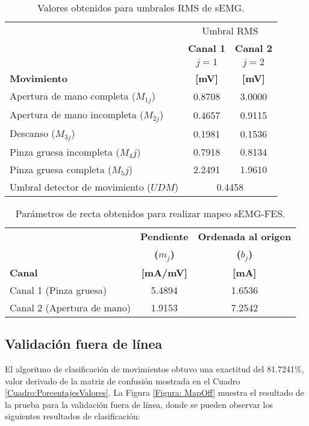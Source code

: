 \begin{table}[htbp]
	\centering
	\begin{tabular}{|l|c|c|}
	\hline
	\textbf{} & \multicolumn{2}{|c|}{Umbral RMS}\\
	\textbf{} & \textbf{Canal 1} & \textbf{Canal 2}\\
	\textbf{} & \textbf{$j=1$} & \textbf{$j=2$}\\
	\textbf{Movimiento} & \textbf{[mV]} & \textbf{[mV]}\\ \hline \hline
	Apertura de mano completa ($M_{1j}$) & 0.8708 & 3.0000\\ \hline
	Apertura de mano incompleta	($M_{2j}$) & 0.4657 & 0.9115\\ \hline
	Descanso ($M_{3j}$) & 0.1981 & 0.1536\\ \hline
	Pinza gruesa incompleta ($M_4j$) & 0.7918 & 0.8134\\ \hline
	Pinza gruesa completa ($M_5j$) & 2.2491 & 1.9610\\ \hline	
	Umbral detector de movimiento ($UDM$) & \multicolumn{2}{|c|}{0.4458}\\ \hline
	\end{tabular}
	\caption{Valores obtenidos para umbrales RMS de sEMG.}
	\label{Cuadro:UmbralesRMS}
\end{table}

\begin{table}[htbp]
	\centering
	\begin{tabular}{|l|c|c|}
	\hline
	\textbf{} & \textbf{Pendiente} & \textbf{Ordenada al origen}\\ 
	\textbf{} & \textbf{($m_{j}$)} & \textbf{($b_{j}$)}\\
	\textbf{Canal} & \textbf{[mA/mV]} & \textbf{[mA]}\\\hline \hline
	Canal 1 (Pinza gruesa) & 5.4894 & 1.6536\\ \hline
	Canal 2 (Apertura de mano) & 1.9153 & 7.2542\\ \hline
	\end{tabular}
	\caption{Parámetros de recta obtenidos para realizar mapeo sEMG-FES.}
	\label{Cuadro:Rectas}
\end{table}


\newpage
\subsection{Validación fuera de línea}
El algoritmo de clasificación de movimientos obtuvo una exactitud del 81.7241\%, valor derivado de la matriz de confusión mostrada en el Cuadro \ref{Cuadro:PorcentajesValores}. La Figura \ref{Figura: MapOff} muestra el resultado de la prueba para la validación fuera de línea, donde se pueden observar los siguientes resultados de clasificación:

